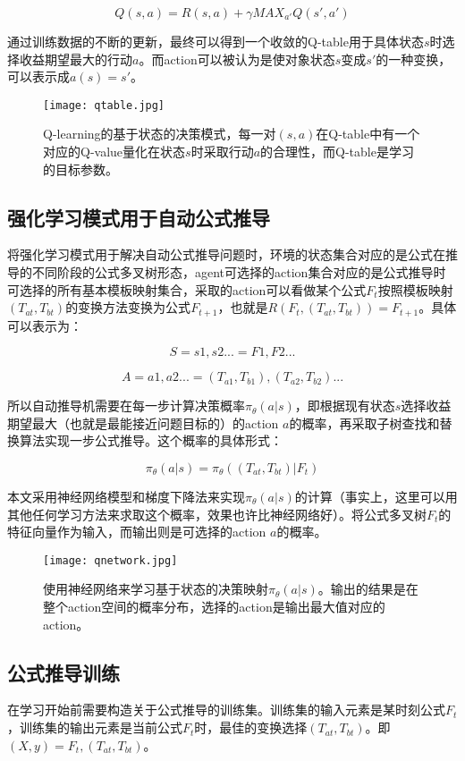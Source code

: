 \documentclass[runningheads]{llncs}
\begin{document}
$$Q(s,a)=R(s,a)+\gamma MAX_{a'}Q(s',a') $$

通过训练数据的不断的更新，最终可以得到一个收敛的Q-table用于具体状态$s$时选择收益期望最大的行动$a$。而action可以被认为是使对象状态$s$变成$s'$的一种变换，可以表示成$a(s)=s'$。

\begin{figure}[H]
\centering
\texttt{[image: qtable.jpg]}
\caption{Q-learning的基于状态的决策模式，每一对$(s,a)$在Q-table中有一个对应的Q-value量化在状态$s$时采取行动$a$的合理性，而Q-table是学习的目标参数。}
\end{figure}

\subsection{强化学习模式用于自动公式推导}
将强化学习模式用于解决自动公式推导问题时，环境的状态集合对应的是公式在推导的不同阶段的公式多叉树形态，agent可选择的action集合对应的是公式推导时可选择的所有基本模板映射集合，采取的action可以看做某个公式$F_t$按照模板映射$(T_{at},T_{bt})$的变换方法变换为公式$F_{t+1}$，也就是$R(F_t,(T_{at},T_{bt}))=F_{t+1}$。具体可以表示为：

$$S={s1,s2...}={F1,F2...}$$

$$A={a1,a2...}={(T_{a1},T_{b1}),(T_{a2},T_{b2})...}$$

所以自动推导机需要在每一步计算决策概率$\pi_{\theta}(a|s)$，即根据现有状态$s$选择收益期望最大（也就是最能接近问题目标的）的action $a$的概率，再采取子树查找和替换算法实现一步公式推导。这个概率的具体形式：

$$\pi_{\theta}(a|s)=\pi_{\theta}((T_{at},T_{bt})|F_t)$$

本文采用神经网络模型和梯度下降法来实现$\pi_{\theta}(a|s)$的计算（事实上，这里可以用其他任何学习方法来求取这个概率，效果也许比神经网络好）。将公式多叉树$F_t$的特征向量作为输入，而输出则是可选择的action $a$的概率。

\begin{figure}[H]
\centering
\texttt{[image: qnetwork.jpg]}
\caption{使用神经网络来学习基于状态的决策映射$\pi_{\theta}(a|s)$。输出的结果是在整个action空间的概率分布，选择的action是输出最大值对应的action。}
\end{figure}

\subsection{公式推导训练}
在学习开始前需要构造关于公式推导的训练集。训练集的输入元素是某时刻公式$F_t$，训练集的输出元素是当前公式$F_t$时，最佳的变换选择$(T_{at},T_{bt})$。即$(X,y)={F_t,(T_{at},T_{bt})}$。
\end{document}
